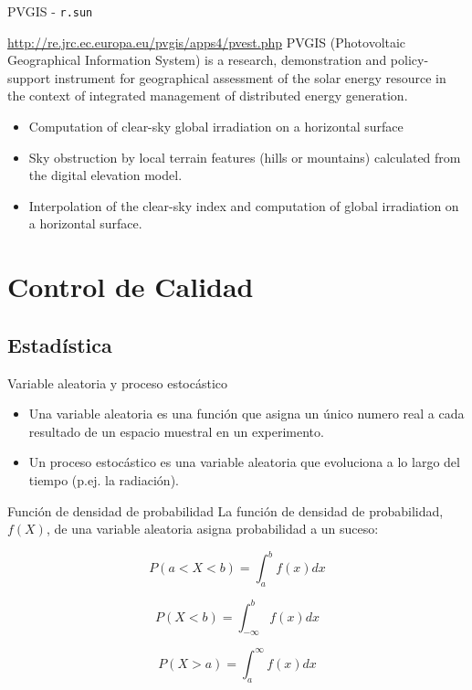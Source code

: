 \documentclass[xcolor={usenames,svgnames,dvipsnames}]{beamer}
\begin{document}
\begin{frame}[fragile,label=sec-6-7-3]{PVGIS - \texttt{r.sun}}
 \begin{block}{\url{http://re.jrc.ec.europa.eu/pvgis/apps4/pvest.php}}
PVGIS (Photovoltaic Geographical Information System) is a research,
demonstration and policy-support instrument for geographical
assessment of the solar energy resource in the context of integrated
management of distributed energy generation.
\begin{itemize}
\item Computation of clear-sky global irradiation on a horizontal surface
\item Sky obstruction by local terrain features (hills or mountains)
calculated from the digital elevation model.
\item Interpolation of the clear-sky index and computation of global
irradiation on a horizontal surface.
\end{itemize}
\end{block}
\end{frame}

\section{Control de Calidad}
\label{sec-7}

\subsection{Estadística}
\label{sec-7-1}


\begin{frame}[label=sec-7-1-1]{Variable aleatoria y proceso estocástico}
\begin{itemize}
\item Una \alert{variable aleatoria} es una función que asigna un único numero
real a cada resultado de un espacio muestral en un experimento.
\item Un \alert{proceso estocástico} es una variable aleatoria que evoluciona a
lo largo del \alert{tiempo} (p.ej. la radiación).
\end{itemize}
\end{frame}


\begin{frame}[label=sec-7-1-2]{Función de densidad de probabilidad}
La función de densidad de probabilidad, $f(X)$, de una variable
aleatoria \alert{asigna probabilidad} a un suceso:


\[
P(a<X<b)=\int_{a}^{b}f(x)dx
\]


\[
P(X<b)=\int_{-\infty}^{b}f(x)dx\]


\[
P(X>a)=\int_{a}^{\infty}f(x)dx\]
\end{frame}
\end{document}
